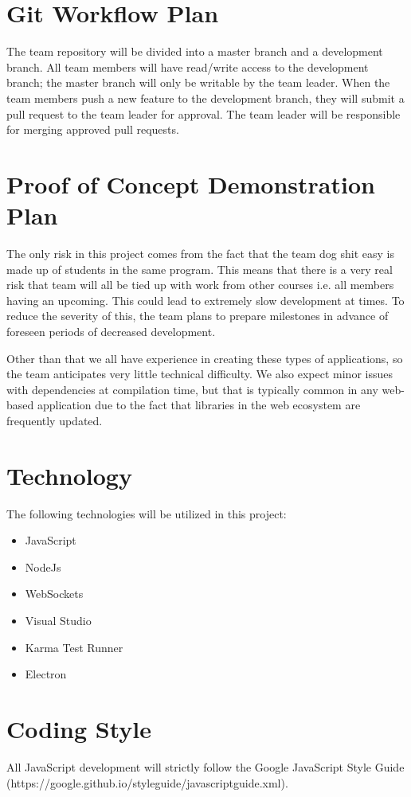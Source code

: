 \documentclass{article}
\begin{document}
\section{Git Workflow Plan}
The team repository will be divided into a master branch and a development branch. All team members will have read/write access to the development branch; the master branch will only be writable by the team leader. When the team members push a new feature to the development branch, they will submit a pull request to the team leader for approval. The team leader will be responsible for merging approved pull requests.

\section{Proof of Concept Demonstration Plan}
The only risk in this project comes from the fact that the team dog shit easy is made up of students in the same program. This means that there is a very real risk that team will all be tied up with work from other courses i.e. all members having an upcoming. This could lead to extremely slow development at times. To reduce the severity of this, the team plans to prepare milestones in advance of foreseen periods of decreased development. 

Other than that we all have experience in creating these types of applications, so the team anticipates very little technical difficulty. We also expect minor issues with dependencies at compilation time, but that is typically common in any web-based application due to the fact that libraries in the web ecosystem are frequently updated. 


\section{Technology}
The following technologies will be utilized in this project: 
\begin{itemize}
    \item JavaScript
    \item NodeJs
    \item WebSockets
    \item Visual Studio
    \item Karma Test Runner
    \item Electron
\end{itemize}

\section{Coding Style}
All JavaScript development will strictly follow the Google JavaScript Style Guide (https://google.github.io/styleguide/javascriptguide.xml).
\end{document}
